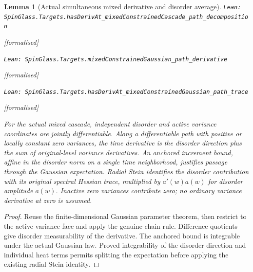 \documentclass[11pt]{article}
\providecommand{\lean}[1]{\leavevmode\par\nopagebreak
  {\noindent\normalfont\footnotesize\raggedright\texttt{Lean: #1}\par}\nopagebreak}
\providecommand{\leanok}{\par\nopagebreak
  {\noindent\normalfont\footnotesize\textcolor{green!50!black}{[formalised]}\par}\nopagebreak}
\newtheorem{lemma}[theorem]{Lemma}
\begin{document}
\begin{lemma}[Actual simultaneous mixed derivative and disorder average]
\lean{SpinGlass.Targets.hasDerivAt\_mixedConstrainedCascade\_path\_decomposition}\leanok
\lean{SpinGlass.Targets.mixedConstrainedGaussian\_path\_derivative}\leanok
\lean{SpinGlass.Targets.hasDerivAt\_mixedConstrainedGaussian\_path\_trace}\leanok
For the actual mixed cascade, independent disorder and active variance
coordinates are jointly differentiable. Along a differentiable path with
positive or locally constant zero variances, the time derivative is the
disorder direction plus the sum of original-level variance derivatives.
An anchored increment bound, affine in the disorder norm on a single time
neighborhood, justifies passage through the Gaussian expectation.
Radial Stein identifies the disorder contribution with its original spectral
Hessian trace, multiplied by $a'(w)a(w)$ for disorder amplitude $a(w)$.
Inactive zero variances contribute zero; no ordinary variance derivative
at zero is assumed.
\end{lemma}
\begin{proof}
Reuse the finite-dimensional Gaussian parameter theorem, then restrict to
the active variance face and apply the genuine chain rule. Difference
quotients give disorder measurability of the derivative. The anchored
bound is integrable under the actual Gaussian law. Proved integrability
of the disorder direction and individual heat terms permits splitting the
expectation before applying the existing radial Stein identity.
\end{proof}
\end{document}
